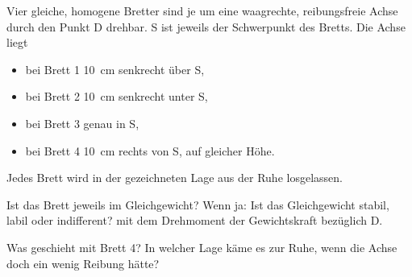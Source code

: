 Vier gleiche, homogene Bretter sind je um eine waagrechte, reibungsfreie Achse durch den Punkt D drehbar. S ist jeweils der Schwerpunkt des Bretts. Die Achse liegt
\begin{itemize}
 \item bei Brett 1 \SI{10}{\cm} senkrecht über S,
 \item bei Brett 2 \SI{10}{\cm} senkrecht unter S,
 \item bei Brett 3 genau in S,
 \item bei Brett 4 \SI{10}{\cm} rechts von S, auf gleicher Höhe.
\end{itemize}
Jedes Brett wird in der gezeichneten Lage aus der Ruhe losgelassen.
\begin{center}
\end{center}

\begin{abcliste}
\abc
Ist das Brett jeweils im Gleichgewicht? Wenn ja: Ist das Gleichgewicht stabil, labil oder indifferent?  mit dem Drehmoment der Gewichtskraft bezüglich D.

\abc
Was geschieht mit Brett 4? In welcher Lage käme es zur Ruhe, wenn die Achse doch ein wenig Reibung hätte?
\end{abcliste}
